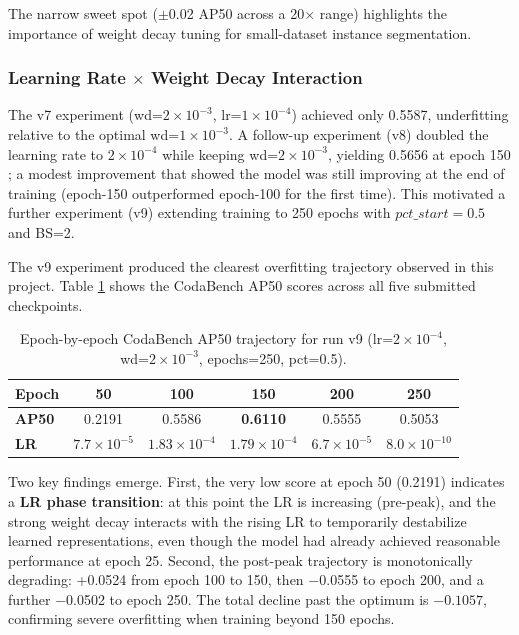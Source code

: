 \documentclass[12pt, a4paper]{article}
\begin{document}
The narrow sweet spot ($\pm$0.02 AP50 across a 20$\times$ range) highlights the importance of weight decay tuning for small-dataset instance segmentation.

\subsubsection{Learning Rate $\times$ Weight Decay Interaction}

The v7 experiment (wd=$2 \times 10^{-3}$, lr=$1 \times 10^{-4}$) achieved only 0.5587, underfitting relative to the optimal wd=$1 \times 10^{-3}$. A follow-up experiment (v8) doubled the learning rate to $2 \times 10^{-4}$ while keeping wd=$2 \times 10^{-3}$, yielding 0.5656 at epoch 150 ; a modest improvement that showed the model was still improving at the end of training (epoch-150 outperformed epoch-100 for the first time). This motivated a further experiment (v9) extending training to 250 epochs with $pct\_start=0.5$ and BS=2.

The v9 experiment produced the clearest overfitting trajectory observed in this project. Table \ref{tab:epoch_trajectory} shows the CodaBench AP50 scores across all five submitted checkpoints.

\begin{table}[htbp]
\centering
\caption{Epoch-by-epoch CodaBench AP50 trajectory for run v9 (lr=$2 \times 10^{-4}$, wd=$2 \times 10^{-3}$, epochs=250, pct=0.5).}
\label{tab:epoch_trajectory}
\begin{tabular}{@{}lccccc@{}}
\toprule
\textbf{Epoch} & 50 & 100 & 150 & 200 & 250 \\ \midrule
\textbf{AP50} & 0.2191 & 0.5586 & \textbf{0.6110} & 0.5555 & 0.5053 \\
\textbf{LR} & $7.7\times10^{-5}$ & $1.83\times10^{-4}$ & $1.79\times10^{-4}$ & $6.7\times10^{-5}$ & $8.0\times10^{-10}$ \\ \bottomrule
\end{tabular}
\end{table}

Two key findings emerge. First, the very low score at epoch 50 (0.2191) indicates a \textbf{LR phase transition}: at this point the LR is increasing (pre-peak), and the strong weight decay interacts with the rising LR to temporarily destabilize learned representations, even though the model had already achieved reasonable performance at epoch 25. Second, the post-peak trajectory is monotonically degrading: +0.0524 from epoch 100 to 150, then $-$0.0555 to epoch 200, and a further $-$0.0502 to epoch 250. The total decline past the optimum is $-0.1057$, confirming severe overfitting when training beyond 150 epochs.
\end{document}
